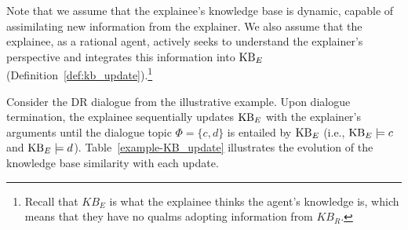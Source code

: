 \documentclass{article}
\begin{document}
Note that we assume that the explainee's knowledge base is dynamic, capable of assimilating new information from the explainer. We also assume that the explainee, as a rational agent, actively seeks to understand the explainer's perspective and integrates this information into $\mathrm{KB}_E$ (Definition~\ref{def:kb_update}).\footnote{Recall that $KB_E$ is what the explainee thinks the agent's knowledge is, which means that they have no qualms adopting information from $KB_R$.}


\begin{example}
Consider the DR dialogue from the illustrative example. Upon dialogue termination, the explainee sequentially updates $\mathrm{KB}_E$ with the explainer's arguments until the dialogue topic $\Phi = \{c, d\}$ is entailed by $\mathrm{KB}_E$ (i.e., $\mathrm{KB}_E \models c$ and $\mathrm{KB}_E \models d$). Table~\ref{example-KB_update} illustrates the evolution of the knowledge base similarity with each update.

\begin{table}[!h]
\renewcommand{\arraystretch}{1.8}
\setlength{\tabcolsep}{3pt}
\caption{Example of knowledge base update and similarity metric.}
\label{example-KB_update}
\end{table}


\end{example}
\end{document}

